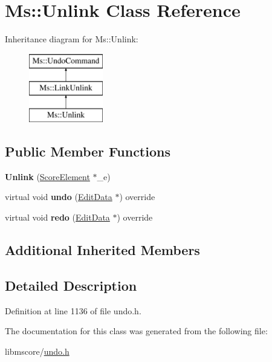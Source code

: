 \hypertarget{class_ms_1_1_unlink}{}\section{Ms\+:\+:Unlink Class Reference}
\label{class_ms_1_1_unlink}
Inheritance diagram for Ms\+:\+:Unlink\+:\begin{figure}[H]
\begin{center}
\leavevmode
\includegraphics[height=3.000000cm]{class_ms_1_1_unlink}
\end{center}
\end{figure}
\subsection*{Public Member Functions}
\begin{DoxyCompactItemize}
\item 
\mbox{\label{class_ms_1_1_unlink_a8226194b6505de991b1dd50112191a3c}} 
{\bfseries Unlink} (\hyperlink{class_ms_1_1_score_element}{Score\+Element} $\ast$\+\_\+e)
\item 
\mbox{\label{class_ms_1_1_unlink_accf1d462d19bc585d15b233353249b8d}} 
virtual void {\bfseries undo} (\hyperlink{class_ms_1_1_edit_data}{Edit\+Data} $\ast$) override
\item 
\mbox{\label{class_ms_1_1_unlink_a45bebf218da55740290c5fea21986bd5}} 
virtual void {\bfseries redo} (\hyperlink{class_ms_1_1_edit_data}{Edit\+Data} $\ast$) override
\end{DoxyCompactItemize}
\subsection*{Additional Inherited Members}


\subsection{Detailed Description}


Definition at line 1136 of file undo.\+h.



The documentation for this class was generated from the following file\+:\begin{DoxyCompactItemize}
\item 
libmscore/\hyperlink{undo_8h}{undo.\+h}\end{DoxyCompactItemize}
